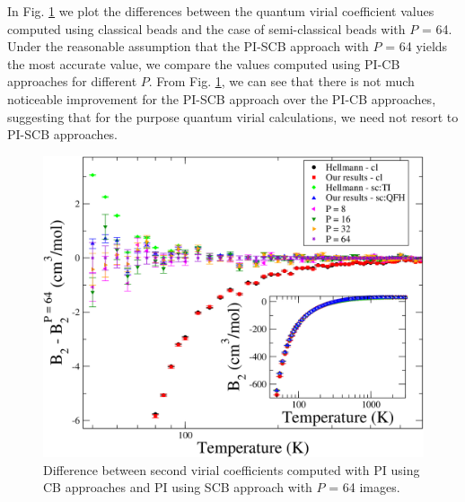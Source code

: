         In Fig. \ref{fig:B2AllDiffPICB} we plot the differences between the quantum virial coefficient values computed using classical beads and the case of semi-classical beads with $P$ = 64. Under the reasonable assumption that the PI-SCB approach with $P$ = 64 yields the most accurate value, we compare the values computed using PI-CB approaches for different $P$. From Fig. \ref{fig:B2AllDiffPICB}, we can see that there is not much noticeable improvement for the PI-SCB approach over the PI-CB approaches, suggesting that for the purpose quantum virial calculations, we need not resort to PI-SCB approaches.
        \begin{figure}[!htbp]
            \centering
            \includegraphics[scale=0.20,keepaspectratio]{Chapter-5/Figures/B2AllDiffPICB.png}
            \caption{Difference between second virial coefficients computed with PI using CB approaches and PI using SCB approach with $P$ = 64 images.}
            \label{fig:B2AllDiffPICB}
        \end{figure}

